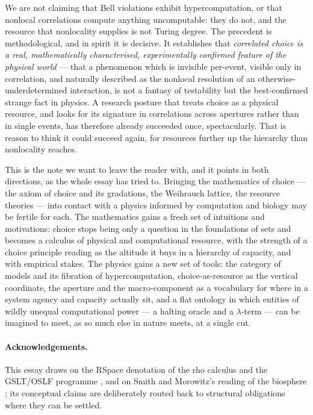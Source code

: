 \documentclass[11pt]{article}
\theoremstyle{definition}
\theoremstyle{plain}
\theoremstyle{remark}
\begin{document}
We are not claiming that Bell violations exhibit hypercomputation, or that nonlocal correlations
compute anything uncomputable: they do not, and the resource that nonlocality supplies is not
Turing degree. The precedent is methodological, and in spirit it is decisive. It establishes
that \emph{correlated choice is a real, mathematically characterised, experimentally confirmed
feature of the physical world} --- that a phenomenon which is invisible per-event, visible only
in correlation, and naturally described as the nonlocal resolution of an otherwise-underdetermined
interaction, is not a fantasy of testability but the best-confirmed strange fact in physics.
A research posture that treats choice as a physical resource, and looks for its signature in
correlations across apertures rather than in single events, has therefore already succeeded once,
spectacularly. That is reason to think it could succeed again, for resources further up the
hierarchy than nonlocality reaches.

This is the note we want to leave the reader with, and it points in both directions, as the whole
essay has tried to. Bringing the mathematics of choice --- the axiom of choice and its gradations,
the Weihrauch lattice, the resource theories --- into contact with a physics informed by computation
and biology may be fertile for each. The mathematics gains a fresh set of intuitions and motivations:
choice stops being only a question in the foundations of sets and becomes a calculus of physical and
computational resource, with the strength of a choice principle reading as the altitude it buys in a
hierarchy of capacity, and with empirical stakes. The physics gains a new set of tools: the category
of models and its fibration of hypercomputation, choice-as-resource as the vertical coordinate, the
aperture and the macro-component as a vocabulary for where in a system agency and capacity actually
sit, and a flat ontology in which entities of wildly unequal computational power --- a halting oracle
and a $\lambda$-term --- can be imagined to meet, as so much else in nature meets, at a single cut.

\paragraph{Acknowledgements.}
This essay draws on the RSpace denotation of the rho calculus \cite{qcs,paths} and the GSLT/OSLF
programme \cite{oslf}, and on Smith and Morowitz's reading of the biosphere \cite{smith}; its
conceptual claims are deliberately routed back to structural obligations where they can be settled.
\end{document}
